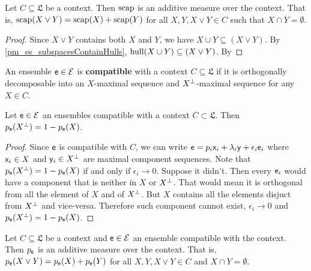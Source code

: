 \begin{prop}
	Let $C \subseteq \mathfrak{L}$ be a context. Then $\capacity$ is an additive measure over the context. That is, $\capacity(X \vee Y) = \capacity(X) + \capacity(Y)$ for all $X, Y, X \vee Y \in C$ such that $X \cap Y = \emptyset$.
\end{prop}

\begin{proof}
	Since $X \vee Y$ contains both $X$ and $Y$, we have $X \cup Y \subseteq(X \vee Y)$. By \ref{pm_es_subspacesContainHulls}, $\hull(X \cup Y) \subseteq(X \vee Y)$. By 
\end{proof}

\begin{defn}
	An ensemble $\ens \in \Ens$ is \textbf{compatible} with a context $C \subseteq \mathfrak{L}$ if it is orthogonally decomposable into an $X$-maximal sequence and $X^{\ortho}$-maximal sequence for any $X \in C$.
\end{defn}

\begin{coro}
	Let $\ens \in \Ens$ an ensembles compatible with a context $C \subset \mathfrak{L}$. Then $p_{\ens}(X^\ortho) = 1 - p_{\ens}(X)$.
\end{coro}

\begin{proof}
	Since $\ens$ is compatible with $C$, we can write $\ens = p_i \ens[x]_i + \lambda_i \ens[y] + \epsilon_i \ens_i$ where $\ens[x]_i \in X$ and $\ens[y]_i \in X^\ortho$ are maximal component sequences. Note that $p_{\ens}(X^\ortho) = 1 - p_{\ens}(X)$ if and only if $\epsilon_i \to 0$. Suppose it didn't. Then every $\ens_i$ would have a component that is neither in $X$ or $X^\ortho$. That would mean it is orthogonal from all the element of $X$ and of $X^\ortho$. But $X$ contains all the elements disjuct from $X^\ortho$ and vice-versa. Therefore such component cannot exist, $\epsilon_i \to 0$ and $p_{\ens}(X^\ortho) = 1 - p_{\ens}(X)$.
\end{proof}

\begin{conj}
	Let $C \subseteq \mathfrak{L}$ be a context and $\ens \in \Ens$ an ensemble compatible with the context. Then $p_{\ens}$ is an additive measure over the context. That is, $p_{\ens}(X \vee Y) = p_{\ens}(X) + p_{\ens}(Y)$ for all $X, Y, X \vee Y \in C$ and $X \cap Y = \emptyset$.
\end{conj}

